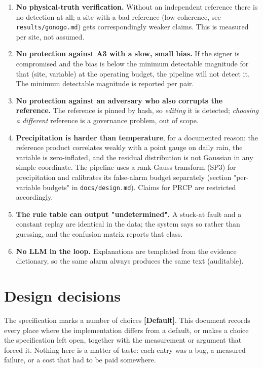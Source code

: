 \documentclass[10pt,a4paper]{article}
\begin{document}
\begin{enumerate}
\item \textbf{No physical-\allowbreak{}truth verification.} Without an independent reference there is
no detection at all; a site with a bad reference (low coherence, see \texttt{results/\allowbreak{}gonogo.md}) gets correspondingly weaker claims. This is measured per site, not assumed.

\item \textbf{No protection against A3 with a slow, small bias.} If the signer is
compromised and the bias is below the minimum detectable magnitude for that (site, variable) at the operating budget, the pipeline will not detect it. The minimum detectable magnitude is reported per pair.

\item \textbf{No protection against an adversary who also corrupts the reference.} The
reference is pinned by hash, so \emph{editing} it is detected; \emph{choosing a different} reference is a governance problem, out of scope.

\item \textbf{Precipitation is harder than temperature}, for a documented reason: the
reference product correlates weakly with a point gauge on daily rain, the variable is zero-\allowbreak{}inflated, and the residual distribution is not Gaussian in any simple coordinate. The pipeline uses a rank-\allowbreak{}Gauss transform (SP3) for precipitation and calibrates its false-\allowbreak{}alarm budget separately (section "per-\allowbreak{}variable budgets" in \texttt{docs/\allowbreak{}design.md}). Claims for PRCP are restricted accordingly.

\item \textbf{The rule table can output "undetermined".} A stuck-\allowbreak{}at fault and a
constant replay are identical in the data; the system says so rather than guessing, and the confusion matrix reports that class.

\item \textbf{No LLM in the loop.} Explanations are templated from the evidence
dictionary, so the same alarm always produces the same text (auditable).

\end{enumerate}

\clearpage
\section*{Design decisions}
The specification marks a number of choices \textbf{[Default]}. This document records every place where the implementation differs from a default, or makes a choice the specification left open, together with the measurement or argument that forced it. Nothing here is a matter of taste: each entry was a bug, a measured failure, or a cost that had to be paid somewhere.
\end{document}
